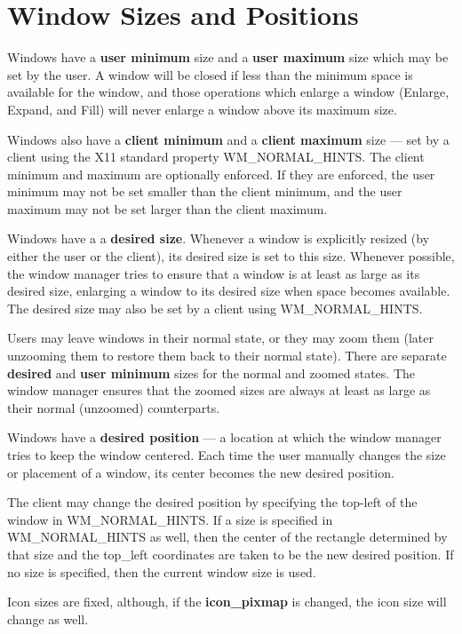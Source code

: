 \section{Window Sizes and Positions}

Windows have a {\bf user minimum} size and a {\bf user maximum}
size which may be set by the user.  A window will be closed if less than
the minimum space is available for the window, and those operations which
enlarge a window (Enlarge, Expand, and Fill) will never enlarge a window
above its maximum size.

Windows also have a {\bf client minimum} and a {\bf client
maximum} size --- set by a client using the X11 standard
property {\sc WM\_NORMAL\_HINTS}.
The client minimum and maximum are optionally enforced.  If they are
enforced, the user minimum may not be set smaller than the client
minimum, and the user maximum may not be set larger than the client
maximum.

Windows have a a {\bf desired size}.  Whenever a window is
explicitly resized (by either the user or the client), its desired size
is set to this size.
Whenever possible, the window manager tries to ensure that a window is at
least as large as its desired size, enlarging a window to its desired
size when space becomes available.  The desired size may also be set by a
client using {\sc WM\_NORMAL\_HINTS}.

Users may leave windows in their normal state, or they may zoom them
(later unzooming them to restore them back to their normal state).
There are separate {\bf desired} and {\bf user minimum} sizes
for the normal and zoomed states.
The window manager ensures that the zoomed sizes are
always at least as large as their normal (unzoomed) counterparts.

Windows have a {\bf desired position} --- a location at which the window
manager tries to keep the window centered.
Each time the user manually changes the size or placement of a window,
its center becomes the new desired position.

The client may change the desired position by specifying the
top-left of the window in {\sc WM\_NORMAL\_HINTS}.  If a size is specified in
{\sc WM\_NORMAL\_HINTS} as well, then the center of the rectangle determined
by that size and the top\_left coordinates are taken to be the new desired
position.  If no size is specified, then the current window size is used.

Icon sizes are fixed, although, if the {\bf icon\_pixmap} is changed, the
icon size will change as well.

